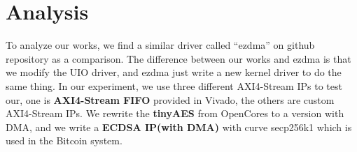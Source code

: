 
\chapter{Analysis}
\label{cha:Analysis}
To analyze our works, we find a similar driver called ``ezdma''\cite{ezdma} on github repository as a comparison. The difference between our works and ezdma is that we modify the UIO driver, and ezdma just write a new kernel driver to do the same thing. In our experiment, we use three different AXI4-Stream IPs to test our, one is \textbf{AXI4-Stream FIFO} provided in Vivado, the others are custom AXI4-Stream IPs. We rewrite the \textbf{tinyAES}\cite{tinyaes} from OpenCores\cite{opencores} to a version with DMA, and we write a \textbf{ECDSA IP(with DMA)} with curve secp256k1 which is used in the Bitcoin system. 







